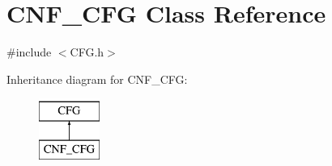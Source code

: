\hypertarget{classCNF__CFG}{\section{\-C\-N\-F\-\_\-\-C\-F\-G \-Class \-Reference}
\label{da/d5c/classCNF__CFG}
}


{\ttfamily \#include $<$\-C\-F\-G.\-h$>$}

\-Inheritance diagram for \-C\-N\-F\-\_\-\-C\-F\-G\-:\begin{figure}[H]
\begin{center}
\leavevmode
\includegraphics[height=2.000000cm]{da/d5c/classCNF__CFG}
\end{center}
\end{figure}

